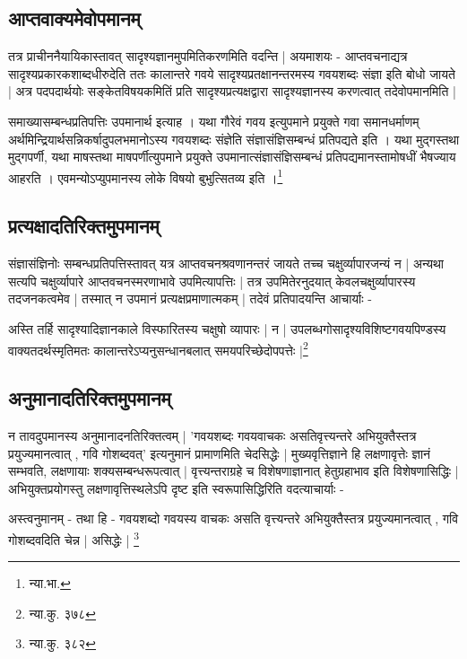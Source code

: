 \subsection{आप्तवाक्यमेवोपमानम्}

तत्र प्राचीननैयायिकास्तावत् सादृश्यज्ञानमुपमितिकरणमिति वदन्ति | अयमाशयः - आप्तवचनाद्यत्र सादृश्यप्रकारकशाब्दधीरुदेति ततः कालान्तरे गवये सादृश्यप्रतक्षानन्तरमस्य गवयशब्दः संज्ञा इति बोधो जायते | अत्र पदपदार्थयोः सङ्केतविषयकमितिं प्रति सादृश्यप्रत्यक्षद्वारा सादृश्यज्ञानस्य करणत्वात् तदेवोपमानमिति |

{\fontsize{11.7}{0}\selectfont\s समाख्यासम्बन्धप्रतिपत्तिः उपमानार्थ इत्याह । यथा गौरेवं गवय इत्युपमाने प्रयुक्ते गवा समानधर्माणम् अर्थमिन्द्रियार्थसन्निकर्षादुपलभमानोऽस्य गवयशब्दः संज्ञेति संज्ञासंज्ञिसम्बन्धं प्रतिपद्यते इति । यथा मुद्गस्तथा मुद्गपर्णी, यथा माषस्तथा माषपर्णीत्युपमाने प्रयुक्ते उपमानात्संज्ञासंज्ञिसम्बन्धं प्रतिपद्यमानस्तामोषधीं भैषज्याय आहरति । एवमन्योऽप्युपमानस्य लोके विषयो बुभुत्सितव्य इति ।\footnote{न्या.भा.}}

\subsection{प्रत्यक्षादतिरिक्तमुपमानम्}

संज्ञासंज्ञिनोः सम्बन्धप्रतिपत्तिस्तावत् यत्र आप्तवचनश्रवणानन्तरं जायते तच्च चक्षुर्व्यापारजन्यं न | अन्यथा सत्यपि चक्षुर्व्यापारे आप्तवचनस्मरणाभावे उपमित्यापत्तिः | तत्र उपमितेरनुदयात् केवलचक्षुर्व्यापारस्य तदजनकत्वमेव | तस्मात् न उपमानं प्रत्यक्षप्रमाणात्मकम् | तदेवं प्रतिपादयन्ति आचार्याः -

{\fontsize{11.7}{0}\selectfont\s अस्ति तर्हि सादृश्यादिज्ञानकाले विस्फारितस्य चक्षुषो व्यापारः | न | उपलब्धगोसादृश्यविशिष्टगवयपिण्डस्य वाक्यतदर्थस्मृतिमतः कालान्तरेऽप्यनुसन्धानबलात् समयपरिच्छेदोपपत्तेः |\footnote{न्या.कु. ३७८}}

\subsection{अनुमानादतिरिक्तमुपमानम्}

न तावदुपमानस्य अनुमानादनतिरिक्तत्वम् | 'गवयशब्दः गवयवाचकः असतिवृत्त्यन्तरे अभियुक्तैस्तत्र प्रयुज्यमानत्वात् , गवि गोशब्दवत्' इत्यनुमानं प्रामाणमिति चेदसिद्धेः | मुख्यवृत्तिज्ञाने हि लक्षणावृत्तेः ज्ञानं सम्भवति, लक्षणायाः शक्यसम्बन्धरूपत्वात् | वृत्त्यन्तराग्रहे च विशेषणाज्ञानात् हेतुग्रहाभाव इति विशेषणासिद्धिः | अभियुक्तप्रयोगस्तु लक्षणावृत्तिस्थलेऽपि दृष्ट इति स्वरूपासिद्धिरिति वदत्याचार्याः - 

{\fontsize{11.7}{0}\selectfont\s अस्त्वनुमानम् - तथा हि - गवयशब्दो गवयस्य वाचकः असति वृत्त्यन्तरे अभियुक्तैस्तत्र प्रयुज्यमानत्वात् , गवि गोशब्दवदिति चेन्न | असिद्धेः | \footnote{न्या.कु. ३८२}}

